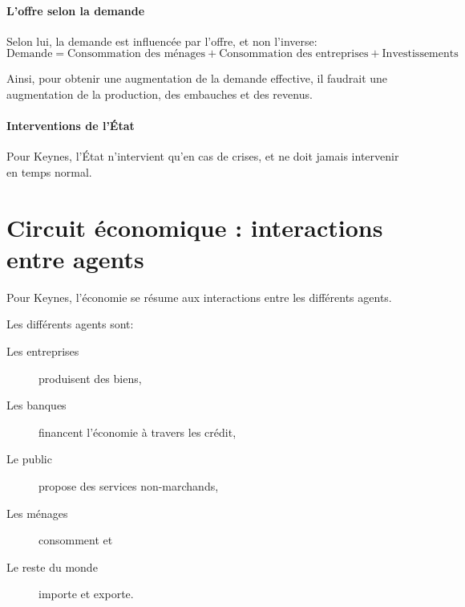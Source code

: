 \documentclass[10pt,a4paper,french]{article}
\begin{document}
\paragraph{L'offre selon la demande}
Selon lui, la demande est influencée par l'offre, et non l'inverse:
\[ \text{Demande} = \text{Consommation des ménages} + \text{Consommation des entreprises} + \text{Investissements} \]

Ainsi, pour obtenir une augmentation de la demande effective, il faudrait une augmentation de la production, des embauches et des revenus.

\paragraph{Interventions de l'État}
Pour Keynes, l'État n'intervient qu'en cas de crises, et ne doit jamais intervenir en temps normal.

\section{Circuit économique : interactions entre agents}

Pour Keynes, l'économie se résume aux interactions entre les différents agents.

Les différents agents sont:
\begin{description}
\item[Les entreprises] produisent des biens,
\item[Les banques] financent l'économie à travers les crédit,
\item[Le public] propose des services non-marchands,
\item[Les ménages] consomment et
\item[Le reste du monde] importe et exporte.
\end{description}

\appendix %
\printindex
\end{document}

